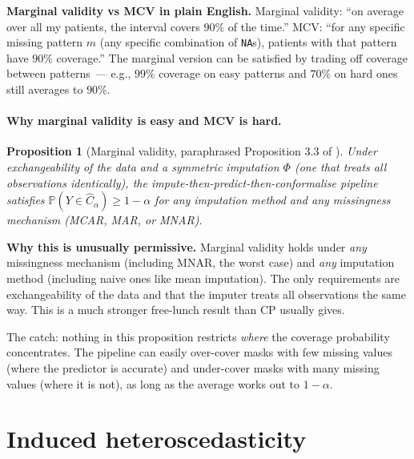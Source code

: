 \documentclass[letterpaper,11pt,leqno]{article}
\newtheorem*{propstar}{Proposition}
\begin{document}
\begin{definitionexplain}
\textbf{Marginal validity vs MCV in plain English.} Marginal validity: ``on average over all my patients, the interval covers $90\%$ of the time.'' MCV: ``for any specific missing pattern $m$ (any specific combination of \texttt{NA}s), patients with that pattern have $90\%$ coverage.'' The marginal version can be satisfied by trading off coverage between patterns~--- e.g., $99\%$ coverage on easy patterns and $70\%$ on hard ones still averages to $90\%$.
\end{definitionexplain}

\paragraph{Why marginal validity is easy and MCV is hard.}

\begin{propstar}[Marginal validity, paraphrased Proposition 3.3 of \cite{zaffran2024missing}]
Under exchangeability of the data and a \emph{symmetric} imputation $\Phi$ (one that treats all observations identically), the impute-then-predict-then-conformalise pipeline satisfies $\mathbb{P}(Y \in \hat{C}_{\alpha}) \geq 1 - \alpha$ for \emph{any} imputation method and \emph{any} missingness mechanism (MCAR, MAR, or MNAR).
\end{propstar}

\begin{theoremexplain}
\textbf{Why this is unusually permissive.} Marginal validity holds under \emph{any} missingness mechanism (including MNAR, the worst case) and \emph{any} imputation method (including naive ones like mean imputation). The only requirements are exchangeability of the data and that the imputer treats all observations the same way. This is a much stronger free-lunch result than CP usually gives.
\end{theoremexplain}

The catch: nothing in this proposition restricts \emph{where} the coverage probability concentrates. The pipeline can easily over-cover masks with few missing values (where the predictor is accurate) and under-cover masks with many missing values (where it is not), as long as the average works out to $1 - \alpha$.

\section{Induced heteroscedasticity}\label{s:hetero}
\end{document}
